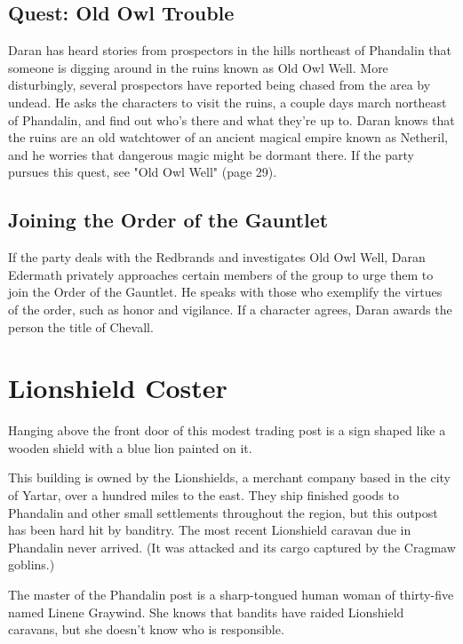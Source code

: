 \documentclass[10pt,a4paper,twoside,bg=print,twocolumn,openany,nodeprecatedcode]{dndbook}
\begin{document}
\subsection{Quest: Old Owl Trouble}
Daran has heard stories from prospectors in the hills northeast of Phandalin that someone is digging around in the ruins known as Old Owl Well. More disturbingly, several prospectors have reported being chased from the area by undead. He asks the characters to visit the ruins, a couple days march northeast of Phandalin, and find out who's there and what they're up to. Daran knows that the ruins are an old watchtower of an ancient magical empire known as Netheril, and he worries that dangerous magic might be dormant there. If the party pursues this quest, see "Old Owl Well" (page 29).

\subsection{Joining the Order of the Gauntlet}
If the party deals with the Redbrands and investigates Old Owl Well, Daran Edermath privately approaches certain members of the group to urge them to join the Order of the Gauntlet. He speaks with those who exemplify the virtues of the order, such as honor and vigilance. If a character agrees, Daran awards the person the title of Chevall.

\section{Lionshield Coster}
\begin{DndReadAloud}{}
Hanging above the front door of this modest trading post is a sign shaped like a wooden shield with a blue lion painted on it.

\end{DndReadAloud}

This building is owned by the Lionshields, a merchant company based in the city of Yartar, over a hundred miles to the east. They ship finished goods to Phandalin and other small settlements throughout the region, but this outpost has been hard hit by banditry. The most recent Lionshield caravan due in Phandalin never arrived. (It was attacked and its cargo captured by the Cragmaw goblins.)

The master of the Phandalin post is a sharp-tongued human woman of thirty-five named Linene Graywind. She knows that bandits have raided Lionshield caravans, but she doesn't know who is responsible.
\end{document}
